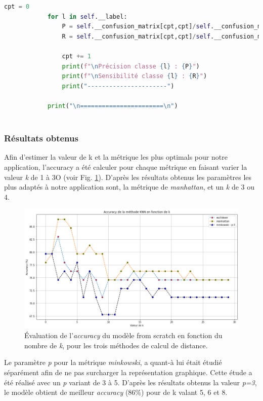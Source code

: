 \documentclass[french]{article}
\begin{document}
\begin{lstlisting}[language=Python]
            cpt = 0
            for l in self.__label:
                P = self.__confusion_matrix[cpt,cpt]/self.__confusion_matrix.sum(axis=0)[cpt]
                R = self.__confusion_matrix[cpt,cpt]/self.__confusion_matrix.sum(axis=1)[cpt]

                cpt += 1
                print(f"\nPrécision classe {l} : {P}")
                print(f"\nSensibilité classe {l} : {R}")
                print("----------------------")

            print("\n=======================\n")
    
\end{lstlisting}

\subsubsection{Résultats obtenus}

Afin d'estimer la valeur de k et la métrique les plus optimals pour notre application, l'accuracy a été calculer pour chaque métrique en faisant varier la valeur \textit{k} de 1 à 3O (voir Fig. \ref{fig:KNN_scratch}). D'après les résultats obtenus les paramètres les plus adaptés à notre application sont, la métrique de  \textit{manhattan}, et un \textit{k} de 3 ou 4.\\

\begin{figure}[!htbp]
    \centering
    \includegraphics[width=\textwidth]{images/k_estimation.png}
    \caption{Évaluation de l'\textit{accuracy} du modèle from scratch en fonction du nombre de \textit{k}, pour les trois méthodes de calcul de distance.}
    \label{fig:KNN_scratch}
\end{figure}

Le paramètre \textit{p} pour la métrique \textit{minkowski}, a quant-à lui était étudié séparément afin de ne pas surcharger la représentation graphique. Cette étude a été réalisé avec un \textit{p} variant de 3 à 5. D'après les résultats obtenus la valeur \textit{p=3}, le modèle obtient de meilleur \textit{accuracy} (86\%) pour de k valant 5, 6 et 8.
\end{document}
